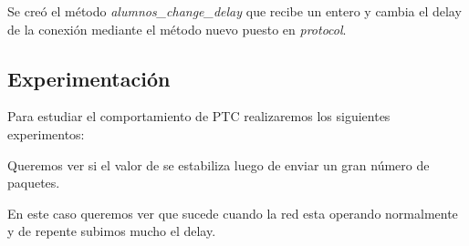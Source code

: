     Se cre\'o el m\'etodo \textit{alumnos\_change\_delay} que recibe un
    entero y cambia el delay de la conexi\'on mediante el m\'etodo nuevo
    puesto en \textit{protocol}.
    
  \subsection{Experimentaci\'on}  
    Para estudiar el comportamiento de PTC realizaremos los siguientes
    experimentos:
    
     Queremos ver si el valor de \rto{} se
    estabiliza luego de enviar un gran n\'umero de paquetes.
  
    
    
     En este
    caso queremos ver que sucede cuando la red esta operando normalmente
    y de repente subimos mucho el delay.
